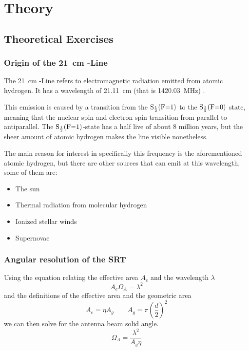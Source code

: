 \section{Theory}
\subsection{Theoretical Exercises}
\subsubsection[Origin of the 21 cm HI-Line]{Origin of the \SI{21}{cm} -Line}
The \SI{21}{cm} -Line refers to electromagnetic radiation emitted from atomic hydrogen. It has a wavelength of \SI{21.11}{cm} (that is \SI{1420.03}{\mega\hertz}) \cite[Ch 3.1]{srt}.

This emission is caused by a transition from the $\ce{S_{\frac{1}{2}}(F=1)}$ to the $\ce{S_{\frac{1}{2}}(F=0)}$ state, meaning that the nuclear spin and electron spin transition from parallel to antiparallel.
The $\ce{S_{\frac{1}{2}}(F=1)}$-state has a half live of about 8 million years, but the sheer amount of atomic hydrogen makes the line visible nonetheless. \cite[Ch. 13.1]{wilson_tools_2009}

The main reason for interest in specifically this frequency is the aforementioned atomic hydrogen, but there are other sources that can emit at this wavelength, some of them are: \cite[11.1-11.4]{wilson_tools_2009}
\begin{itemize}
    \item The sun
    \item Thermal radiation from molecular hydrogen
    \item Ionized stellar winds
    \item Supernovae
\end{itemize}
\subsubsection{Angular resolution of the SRT}\label{sec:ang_res}
Using the equation relating the effective area $A_e$ and the wavelength $\lambda$ \cite[p. 149]{wilson_tools_2009}
\begin{equation}
    A_e \Omega_A = \lambda^2
\end{equation}
and the definitions of the effective area and the geometric area \cite[p. 148]{wilson_tools_2009}
\begin{equation}
    A_e = \eta A_g \qquad A_g = \pi \left( \frac{d}{2} \right)^2 \label{eq:A_e}
\end{equation}
we can then solve for the antenna beam solid angle.
\begin{equation}
    \Omega_A = \frac{\lambda^2}{A_g \eta} \label{eq:Omega_A}
\end{equation}


